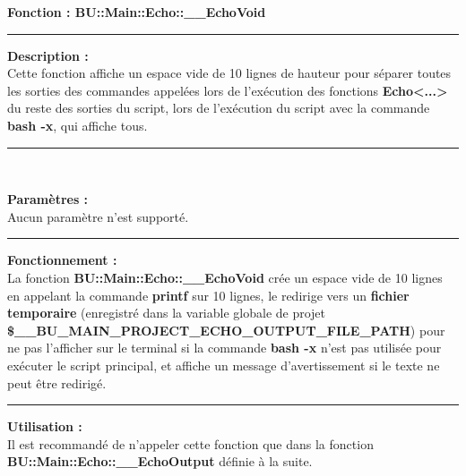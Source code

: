 \documentclass[a4paper,10pt]{article}
\begin{document}
\textbf{Fonction : \color{func}BU::Main::Echo::\_\_EchoVoid}\setlength{\parskip}{1em}


\par\noindent\rule{\textwidth}{0.4pt}

\begin{justify}
    \textbf{Description :}\\[1\baselineskip]
    Cette fonction affiche un espace vide de 10 lignes de hauteur pour séparer toutes les sorties des commandes appelées lors de l'exécution des fonctions \textbf{\color{func}Echo<...>} du reste des sorties du script, lors de l'exécution du script avec la commande \textbf{\color{cmds}bash -x}, qui affiche tous.
\end{justify}


\par\noindent\rule{\textwidth}{0.4pt}\\

\begin{justify}
    \textbf{Paramètres :}\\[1\baselineskip]
    Aucun paramètre n'est supporté.
\end{justify}


\par\noindent\rule{\textwidth}{0.4pt}

\begin{justify}
    \textbf{Fonctionnement :}\\[1\baselineskip]
    La fonction \textbf{\color{func}BU::Main::Echo::\_\_EchoVoid} crée un espace vide de 10 lignes en appelant la commande \textbf{\color{cmds}printf} sur 10 lignes, le redirige vers un \textbf{\color{path}fichier temporaire} (enregistré dans la variable globale de projet \textbf{\color{vars}\$\_\_BU\_MAIN\_PROJECT\_ECHO\_OUTPUT\_FILE\_PATH}) pour ne pas l'afficher sur le terminal si la commande \textbf{\color{cmds}bash -x} n'est pas utilisée pour exécuter le script principal, et affiche un message d'avertissement si le texte ne peut être redirigé.
\end{justify}


\par\noindent\rule{\textwidth}{0.4pt}

\begin{justify}
    \textbf{Utilisation :}\\[1\baselineskip]
    Il est recommandé de n'appeler cette fonction que dans la fonction \textbf{\color{func}BU::Main::Echo::\_\_EchoOutput} définie à la suite.
\end{justify}
\end{document}
